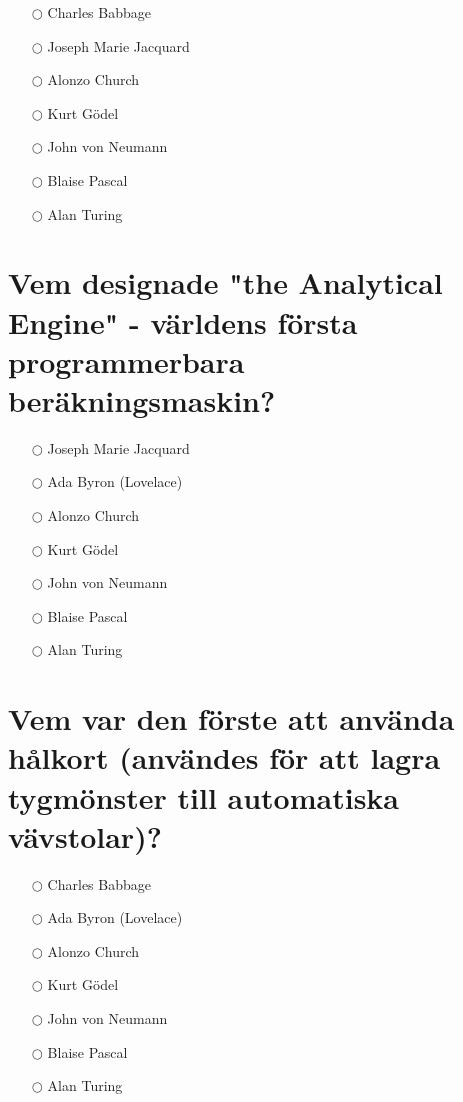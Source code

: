 \documentclass[a4paper,11pt,oneside]{book}
\begin{document}
\begin{sloppypar}
\label{q:434:mc:sv:True}

\begin{itemize}
  \item[$\bigcirc$] Charles Babbage
  \item[$\bigcirc$] Joseph Marie Jacquard
  \item[$\bigcirc$] Alonzo Church
  \item[$\bigcirc$] Kurt G\"odel
  \item[$\bigcirc$] John von Neumann
  \item[$\bigcirc$] Blaise Pascal
  \item[$\bigcirc$] Alan Turing
\end{itemize}



\section{Vem designade "the Analytical Engine" - v\"arldens f\"orsta programmerbara ber\"akningsmaskin?}

\label{q:435:mc:sv:True}

\begin{itemize}
  \item[$\bigcirc$] Joseph Marie Jacquard
  \item[$\bigcirc$] Ada Byron (Lovelace)
  \item[$\bigcirc$] Alonzo Church
  \item[$\bigcirc$] Kurt G\"odel
  \item[$\bigcirc$] John von Neumann
  \item[$\bigcirc$] Blaise Pascal
  \item[$\bigcirc$] Alan Turing
\end{itemize}



\section{Vem var den f\"orste att anv\"anda h\r{a}lkort (anv\"andes f\"or att lagra tygm\"onster till automatiska v\"avstolar)?}

\label{q:436:mc:sv:True}

\begin{itemize}
  \item[$\bigcirc$] Charles Babbage
  \item[$\bigcirc$] Ada Byron (Lovelace)
  \item[$\bigcirc$] Alonzo Church
  \item[$\bigcirc$] Kurt G\"odel
  \item[$\bigcirc$] John von Neumann
  \item[$\bigcirc$] Blaise Pascal
  \item[$\bigcirc$] Alan Turing
\end{itemize}




\end{sloppypar}
\end{document}
